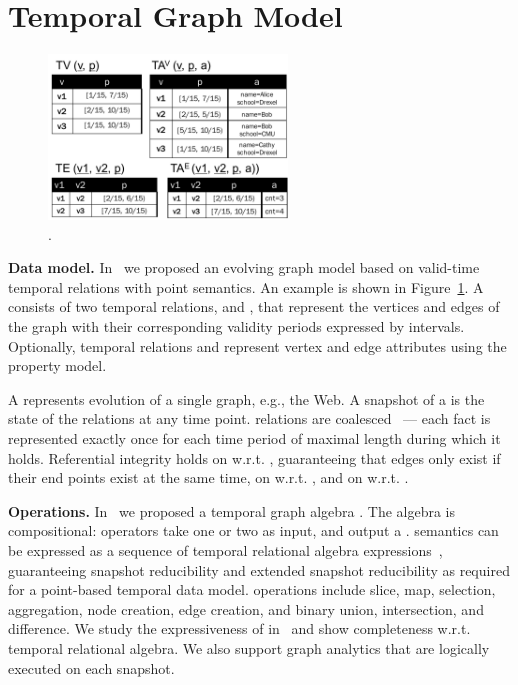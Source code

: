 \section{Temporal Graph Model}
\label{sec:tga}

\begin{figure}[t]
\centering
\includegraphics[width=2.5in]{figs/T1_rel.pdf}
\vspace{-0.2cm}
\caption{\tg {}.}
\vspace{-0.6cm}
\label{fig:tg_rel}
\end{figure}

{\bf Data model.}  In~\cite{PortalarXiv2016} we proposed an evolving
graph model \tg based on valid-time temporal relations with point
semantics. An example is shown in Figure~\ref{fig:tg_rel}.  A \tg
consists of two temporal relations,  and , that
represent the vertices and edges of the graph with their corresponding
validity periods expressed by intervals.  Optionally, temporal
relations  and  represent vertex and edge
attributes using the property model.

A \tg represents evolution of a single graph, e.g., the Web.
A snapshot of a \tg is the state of the relations at any time point.
\tg relations are coalesced~\cite{DBLP:conf/vldb/BohlenSS96} --- each
fact is represented exactly once for each
time period of maximal length during which it holds.  Referential
integrity holds on  w.r.t. , guaranteeing that edges
only exist if their end points exist at the same time, on 
w.r.t. , and on  w.r.t. .

{\bf Operations.} In~\cite{PortalarXiv2016} we proposed a temporal
graph algebra \tga.  The algebra is compositional: operators take one
or two \tgs as input, and output a \tg.  \tga semantics can be
expressed as a sequence of temporal relational algebra
expressions~\cite{Dignos2012}, guaranteeing snapshot reducibility and
extended snapshot reducibility as required for a point-based temporal
data model.  \tga operations include slice, map, selection,
aggregation, node creation, edge creation, and binary union,
intersection, and difference.  We study the expressiveness of \tga
in~\cite{PortalarXiv2016} and show completeness w.r.t. temporal
relational algebra.  We also support graph analytics
that are logically executed on each snapshot.

